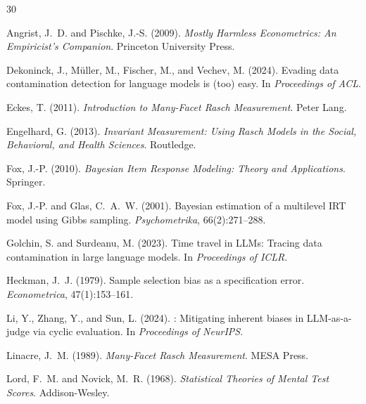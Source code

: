 \documentclass[letterpaper,11pt]{article}
\begin{document}

\begin{thebibliography}{30}

Angrist, J.~D. and Pischke, J.-S. (2009).
\newblock \emph{Mostly Harmless Econometrics: An Empiricist's Companion}.
\newblock Princeton University Press.

Dekoninck, J., Müller, M., Fischer, M., and Vechev, M. (2024).
\newblock Evading data contamination detection for language models is (too) easy.
\newblock In \emph{Proceedings of ACL}.

Eckes, T. (2011).
\newblock \emph{Introduction to Many-Facet Rasch Measurement}.
\newblock Peter Lang.

Engelhard, G. (2013).
\newblock \emph{Invariant Measurement: Using Rasch Models in the Social, Behavioral, and Health Sciences}.
\newblock Routledge.

Fox, J.-P. (2010).
\newblock \emph{Bayesian Item Response Modeling: Theory and Applications}.
\newblock Springer.

Fox, J.-P. and Glas, C.~A.~W. (2001).
\newblock Bayesian estimation of a multilevel {IRT} model using {Gibbs} sampling.
\newblock \emph{Psychometrika}, 66(2):271--288.

Golchin, S. and Surdeanu, M. (2023).
\newblock Time travel in {LLMs}: Tracing data contamination in large language models.
\newblock In \emph{Proceedings of ICLR}.

Heckman, J.~J. (1979).
\newblock Sample selection bias as a specification error.
\newblock \emph{Econometrica}, 47(1):153--161.

Li, Y., Zhang, Y., and Sun, L. (2024).
: Mitigating inherent biases in {LLM}-as-a-judge via cyclic evaluation.
\newblock In \emph{Proceedings of NeurIPS}.

Linacre, J.~M. (1989).
\newblock \emph{Many-Facet Rasch Measurement}.
\newblock MESA Press.

Lord, F.~M. and Novick, M.~R. (1968).
\newblock \emph{Statistical Theories of Mental Test Scores}.
\newblock Addison-Wesley.


\end{thebibliography}
\end{document}
